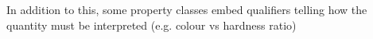 \documentclass[11pt,a4paper]{ivoa}
\newcommand{\TODO}[1]{%
    \noindent%
    \colorbox{todocolor}{%
            \parbox{0.85\linewidth}{\sffamily \textbf{TODO:}\\
            #1}
    }%
    \vspace{2pt}

}
\begin{document}
In addition to this, some property classes embed qualifiers telling how the quantity
must be interpreted (e.g. colour vs hardness ratio)


%
\end{document}
